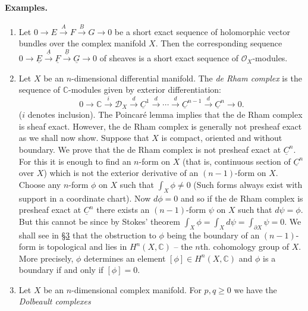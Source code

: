 \paragraph{Examples.}
\begin{enumerate}[start=20]
\item Let $0\to E\xrightarrow{A}F\xrightarrow{B}G\to0$ be a short exact sequence of holomorphic vector bundles over the complex manifold $X$. Then the corresponding sequence $0\to\underline E\xrightarrow{\underline A}\underline F\xrightarrow{\underline B}\underline G\to0$ of sheaves is a short exact sequence of $\mathcal O_X$-modules.
\item Let $X$ be an $n$-dimensional differential manifold. The \emph{de Rham complex} is the sequence of $\mathbb C$-modules given by exterior differentiation:
\[
0\to\mathbb C\xrightarrow{i}\mathcal D_X\xrightarrow{d}\underline C^1\xrightarrow{d}\cdots\xrightarrow{d}\underline C^{n-1}\xrightarrow{d}\underline C^n\to0.
\]
($i$ denotes inclusion).
The Poincar\'e lemma implies that the de Rham complex is sheaf exact. However, the de Rham complex is generally not presheaf exact as we shall now show. Suppose that $X$ is compact, oriented and without boundary. We prove that the de Rham complex is not presheaf exact at $\underline C^n$. For this it is enough to find an $n$-form on $X$ (that is, continuous section of $\underline C^n$ over $X$) which is not the exterior derivative of an $(n-1)$-form on $X$. Choose any $n$-form $\phi$ on $X$ such that $\int_X\phi\ne0$ (Such forms always exist with support in a coordinate chart). Now $d\phi=0$ and so if the de Rham complex is presheaf exact at $\underline C^n$ there exists an $(n-1)$-form $\psi$ on $X$ such that $d\psi=\phi$. But this cannot be since by Stokes' theorem $\int_X\phi=\int_X d\psi=\int_{\partial X}\psi=0$. We shall see in \hyperref[sec:6:3]{\S3} that the obstruction to $\phi$ being the boundary of an $(n-1)$-form is topological and lies in $H^n(X,\mathbb C)$ -- the $n$th. cohomology group of $X$. More precisely, $\phi$ determines an element $[\phi]\in H^n(X,\mathbb C)$ and $\phi$ is a boundary if and only if $[\phi]=0$.
\item Let $X$ be an $n$-dimensional complex manifold. For $p,q\geq0$ we have the \emph{Dolbeault complexes}

\end{enumerate}
